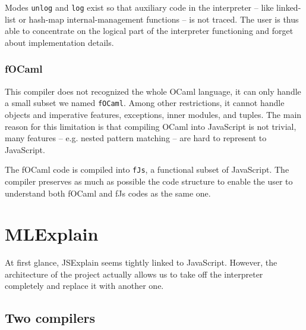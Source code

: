 \documentclass[twocolumn]{article}
\begin{document}
Modes \texttt{unlog} and \texttt{log} exist so that auxiliary code in the
interpreter -- like linked-list or hash-map internal-management functions -- is
not traced.  The user is thus able to concentrate on the logical part of the
interpreter functioning and forget about implementation details.

\subsubsection{fOCaml}
This compiler does not recognized the whole OCaml language, it can only handle
a small subset we named \texttt{fOCaml}. Among other restrictions, it cannot
handle objects and imperative features, exceptions, inner modules, and tuples.
The main reason for this limitation is that compiling OCaml into JavaScript is
not trivial, many features -- e.g. nested pattern matching -- are hard to
represent to JavaScript.

The fOCaml code is compiled into \texttt{fJs}, a functional subset of
JavaScript. The compiler preserves as much as possible the code structure to
enable the user to understand both fOCaml and fJs codes as the same one.


\section{MLExplain}

At first glance, JSExplain seems tightly linked to JavaScript. However, the
architecture of the project actually allows us to take off the interpreter
completely and replace it with another one.


\subsection{Two compilers}
\end{document}
